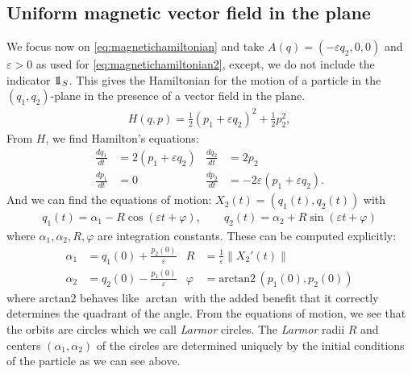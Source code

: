 \subsection{Uniform magnetic vector field in the plane}

We focus now on \eqref{eq:magnetichamiltonian} and take $A(q)=(-\varepsilon q_2,0,0)$ and $\varepsilon>0$ as used for \eqref{eq:magnetichamiltonian2}, except, we do not include the indicator $\one_S$. This gives the Hamiltonian for the motion of a particle in the $(q_1,q_2)$-plane in the presence of a vector field in the plane.
\begin{align}\label{eq:uniformmagneticfieldHamiltonian}
H(q,p) =
\frac{1}{2}(p_1+\varepsilon q_2)^2+\frac{1}{2}p_2^2,
\end{align}
From $H$, we find Hamilton's equations:
\begin{align*}
\frac{dq_1}{dt} &= 2(p_1+\varepsilon q_2) 	& \frac{dq_2}{dt} &= 2p_2\\
\frac{dp_1}{dt} &=0							& \frac{dp_2}{dt} &=-2\varepsilon(p_1+\varepsilon q_2).
\end{align*}
And we can find the equations of motion: $X_2(t) = (q_1(t),q_2(t))$ with
\begin{align*}
q_1(t) = \alpha_1 - R\cos(\varepsilon t+\varphi),\qquad 
q_2(t) = \alpha_2 + R\sin(\varepsilon t+\varphi)
\end{align*}
where $\alpha_1,\alpha_2,R,\varphi$ are integration constants. These can be computed explicitly:
\begin{align*}
\alpha_1 &= q_1(0)+\frac{p_2(0)}{\varepsilon} &
		R &= \frac{1}{\varepsilon}\|X_2'(t)\|\\
\alpha_2  &= q_2(0)-\frac{p_1(0)}{\varepsilon} &
		\varphi &= \text{arctan2}\,(p_1(0),p_2(0))
\end{align*}
where $\text{arctan2}$ behaves like $\arctan$ with the added benefit that it correctly determines the quadrant of the angle. From the equations of motion, we see that the orbits are circles which we call \textit{Larmor} circles. The \textit{Larmor} radii $R$ and centers  $(\alpha_1,\alpha_2)$ of the circles are determined uniquely by the initial conditions of the particle as we can see above.
